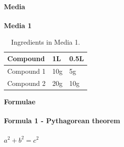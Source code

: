\documentclass[15pt,idxtotoc,hyperref,openany]{labbook} %
\begin{document}

\newpage

\huge \textbf{Media} \\ \\

\normalsize \textbf{Media 1}\\
\begin{table}[H]
\begin{tabular}{l l l}
\toprule
\textbf{Compound} & \textbf{1L} & \textbf{0.5L}\\
\toprule
Compound 1 & 10g & 5g\\
Compound 2 & 20g & 10g\\
\bottomrule
\end{tabular}
\caption{Ingredients in Media 1.}
\label{tab:med1}
\end{table}





\newpage

\huge \textbf{Formulae} \\ \\

\normalsize \textbf{Formula 1 - Pythagorean theorem}\\ \\
$a^2 + b^2 = c^2$\\ \\




\end{document}
